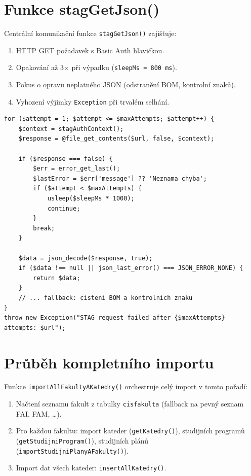 \documentclass[12pt,a4paper]{report}
\begin{document}
\section{Funkce stagGetJson()}

Centrální komunikační funkce \texttt{stagGetJson()} zajišťuje:
\begin{enumerate}
  \item HTTP GET požadavek s Basic Auth hlavičkou.
  \item Opakování až 3× při výpadku (\texttt{sleepMs = 800 ms}).
  \item Pokus o opravu neplatného JSON (odstranění BOM, kontrolní znaků).
  \item Vyhození výjimky \texttt{Exception} při trvalém selhání.
\end{enumerate}

\begin{lstlisting}[caption={Jádro funkce stagGetJson() -- retry logika}]
for ($attempt = 1; $attempt <= $maxAttempts; $attempt++) {
    $context = stagAuthContext();
    $response = @file_get_contents($url, false, $context);

    if ($response === false) {
        $err = error_get_last();
        $lastError = $err['message'] ?? 'Neznama chyba';
        if ($attempt < $maxAttempts) {
            usleep($sleepMs * 1000);
            continue;
        }
        break;
    }

    $data = json_decode($response, true);
    if ($data !== null || json_last_error() === JSON_ERROR_NONE) {
        return $data;
    }
    // ... fallback: cisteni BOM a kontrolnich znaku
}
throw new Exception("STAG request failed after {$maxAttempts} attempts: $url");
\end{lstlisting}

\section{Průběh kompletního importu}

Funkce \texttt{importAllFakultyAKatedry()} orchestruje celý import v tomto pořadí:
\begin{enumerate}
  \item Načtení seznamu fakult z tabulky \texttt{cisfakulta} (fallback na pevný seznam FAI, FAM, \ldots).
  \item Pro každou fakultu: import kateder (\texttt{getKatedry()}), studijních programů (\texttt{getStudijniProgram()}), studijních plánů (\texttt{importStudijniPlanyAFakulty()}).
  \item Import dat všech kateder: \texttt{insertAllKatedry()}.
\end{enumerate}
\end{document}
